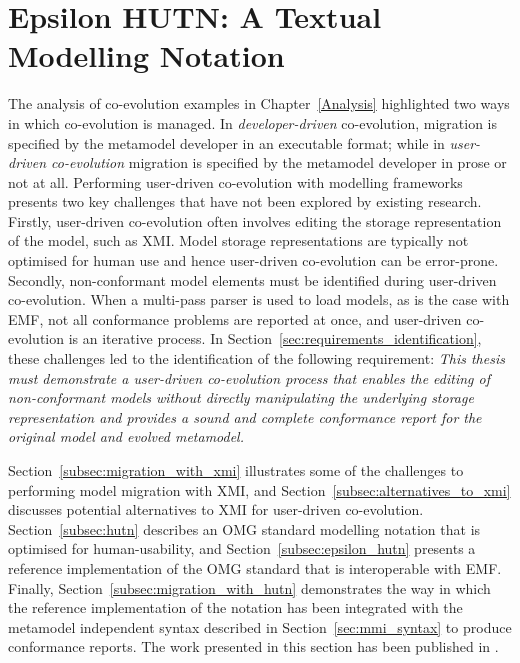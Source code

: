 
\section{Epsilon HUTN: A Textual Modelling Notation}
\label{sec:notation}
The analysis of co-evolution examples in Chapter~\ref{Analysis} highlighted two ways in which co-evolution is managed. In \emph{developer-driven} co-evolution, migration is specified by the metamodel developer in an executable format; while in \emph{user-driven co-evolution} migration is specified by the metamodel developer in prose or not at all. Performing user-driven co-evolution with modelling frameworks presents two key challenges that have not been explored by existing research. Firstly, user-driven co-evolution often involves editing the storage representation of the model, such as XMI. Model storage representations are typically not optimised for human use and hence user-driven co-evolution can be error-prone. Secondly, non-conformant model elements must be identified during user-driven co-evolution. When a multi-pass parser is used to load models, as is the case with EMF, not all conformance problems are reported at once, and user-driven co-evolution is an iterative process. In Section~\ref{sec:requirements_identification}, these challenges led to the identification of the following requirement: \emph{This thesis must demonstrate a user-driven co-evolution process that enables the editing of non-conformant models without directly manipulating the underlying storage representation and provides a sound and complete conformance report for the original model and evolved metamodel.}

Section~\ref{subsec:migration_with_xmi} illustrates some of the challenges to performing model migration with XMI, and Section~\ref{subsec:alternatives_to_xmi} discusses potential alternatives to XMI for user-driven co-evolution. Section~\ref{subsec:hutn} describes an OMG standard modelling notation that is optimised for human-usability, and Section~\ref{subsec:epsilon_hutn} presents a reference implementation of the OMG standard that is interoperable with EMF. Finally, Section~\ref{subsec:migration_with_hutn} demonstrates the way in which the reference implementation of the notation has been integrated with the metamodel independent syntax described in Section~\ref{sec:mmi_syntax} to produce conformance reports. The work presented in this section has been published in \cite{rose08hutn}.

